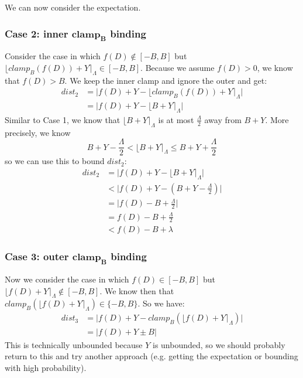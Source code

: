 \documentclass[11pt]{scrartcl} %
\begin{document}
We can now consider the expectation.

\subsubsection{Case 2: inner $\boldsymbol{clamp_B}$ binding}
Consider the case in which $f(D) \not\in [-B, B]$ but $\lfloor clamp_{B}\left( f(D) \right) + Y \rceil_{\Lambda} \in [-B, B]$.
Because we assume $f(D) > 0$, we know that $f(D) > B$. We keep the inner clamp and ignore the outer and get:
\begin{align}
	dist_2 &= \big\vert f(D) + Y - \lfloor clamp_{B}\left(f(D)\right) + Y \rceil_{\Lambda} \big\vert \nonumber \\
		   &= \big\vert f(D) + Y - \lfloor B + Y \rceil_{\Lambda} \big\vert \nonumber
\end{align}
Similar to Case 1, we know that $\lfloor B + Y \rceil_{\Lambda}$ is at most $\frac{\Lambda}{2}$ away from $B + Y$. More precisely, we know
\[ B + Y - \frac{\Lambda}{2} < \lfloor B + Y \rceil_{\Lambda} \leq B + Y + \frac{\Lambda}{2} \]
so we can use this to bound $dist_2$:
\begin{align}
	dist_2 &= \big\vert f(D) + Y - \lfloor B + Y \rceil_{\Lambda} \big\vert \nonumber \\
		   &< \bigg\vert f(D) + Y - \left( B + Y - \frac{\Lambda}{2} \right) \bigg\vert \nonumber \\
		   &= \bigg\vert f(D) - B + \frac{\Lambda}{2} \bigg\vert \nonumber \\
		   &= f(D) - B + \frac{\Lambda}{2} \nonumber \\
		   &< f(D) - B + \lambda \nonumber
\end{align}

\subsubsection{Case 3: outer $\boldsymbol{clamp_B}$ binding}
Now we consider the case in which $f(D) \in [-B, B]$ but $\lfloor f(D) + Y \rceil_{\Lambda} \not\in [-B, B]$. We know then that $clamp_{B} \left( \lfloor f(D) + Y \rceil_{\Lambda} \right) \in \{-B, B\}$. So we have:
\begin{align}
	dist_3 &= \bigg\vert f(D) + Y - clamp_{B}\left( \lfloor f(D) + Y \rceil_{\Lambda} \right) \bigg\vert \nonumber \\
		   &= \bigg\vert f(D) + Y \pm B \bigg \vert \nonumber
\end{align}
This is technically unbounded because $Y$ is unbounded, so we should probably return to this and try another approach (e.g. getting the expectation or bounding with high probability).
\end{document}
